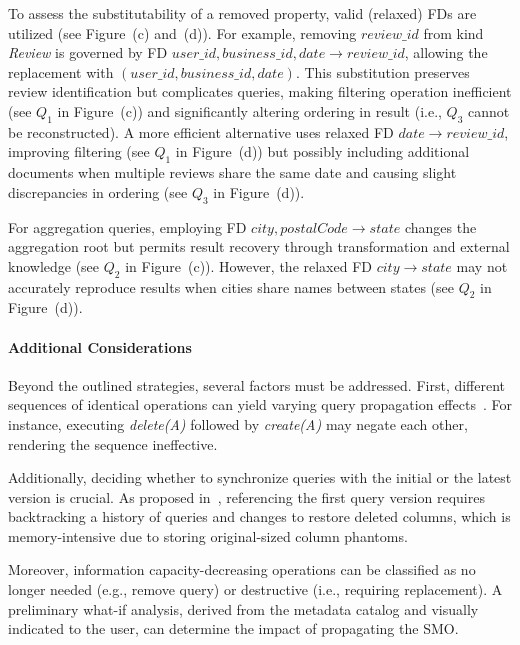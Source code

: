 \begin{example}
To assess the substitutability of a removed property, valid (relaxed) FDs are utilized (see Figure~(c) and~(d)). For example, removing $review\_id$ from kind \textit{Review} is governed by FD $user\_id, business\_id, date \rightarrow review\_id$, allowing the replacement with $(user\_id, business\_id, date)$. This substitution preserves review identification but complicates queries, making filtering operation inefficient (see $Q_1$ in Figure~(c)) and significantly altering ordering in result (i.e., $Q_3$ cannot be reconstructed). 
A more efficient alternative uses relaxed FD $date \rightarrow review\_id$, improving filtering (see $Q_1$ in Figure~(d)) but possibly including additional documents when multiple reviews share the same date and causing slight discrepancies in ordering (see $Q_3$ in Figure~(d)). 

For aggregation queries, employing FD $city, postalCode \rightarrow state$ changes the aggregation root but permits result recovery through transformation and external knowledge (see $Q_2$ in Figure~(c)). However, the relaxed FD $city \rightarrow state$ may not accurately reproduce results when cities share names between states (see $Q_2$ in Figure~(d)).
\end{example}




\paragraph{Additional Considerations}
Beyond the outlined strategies, several factors must be addressed. First, different sequences of identical operations can yield varying query propagation effects~\citep{DBLP:conf/krdb/RundensteinerLN97}. For instance, executing \textit{delete(A)} followed by \textit{create(A)} may negate each other, rendering the sequence ineffective.

Additionally, deciding whether to synchronize queries with the initial or the latest version is crucial. As proposed in~\citep{DBLP:journals/kais/KoellerR05}, referencing the first query version requires backtracking a history of queries and changes to restore deleted columns, which is memory-intensive due to storing original-sized column phantoms.

Moreover, information capacity-decreasing operations can be classified as no longer needed (e.g., remove query) or destructive (i.e., requiring replacement). A preliminary what-if analysis, derived from the metadata catalog and visually indicated to the user, can determine the impact of propagating the SMO.

